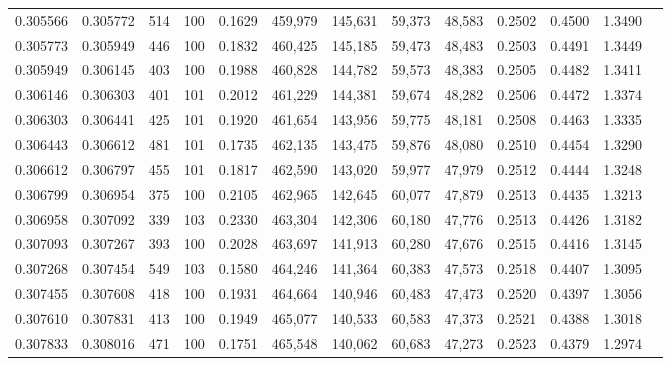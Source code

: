 \begin{tabular}{rrrrrrrrrrrrr}
0.305566 & 0.305772 &   514 & 100 &                                     0.1629 & 459,979 & 145,631 &  59,373 &  48,583 & 0.2502 & 0.4500 & 1.3490 \\
0.305773 & 0.305949 &   446 & 100 &                                     0.1832 & 460,425 & 145,185 &  59,473 &  48,483 & 0.2503 & 0.4491 & 1.3449 \\
0.305949 & 0.306145 &   403 & 100 &                                     0.1988 & 460,828 & 144,782 &  59,573 &  48,383 & 0.2505 & 0.4482 & 1.3411 \\
0.306146 & 0.306303 &   401 & 101 &                                     0.2012 & 461,229 & 144,381 &  59,674 &  48,282 & 0.2506 & 0.4472 & 1.3374 \\
0.306303 & 0.306441 &   425 & 101 &                                     0.1920 & 461,654 & 143,956 &  59,775 &  48,181 & 0.2508 & 0.4463 & 1.3335 \\
0.306443 & 0.306612 &   481 & 101 &                                     0.1735 & 462,135 & 143,475 &  59,876 &  48,080 & 0.2510 & 0.4454 & 1.3290 \\
0.306612 & 0.306797 &   455 & 101 &                                     0.1817 & 462,590 & 143,020 &  59,977 &  47,979 & 0.2512 & 0.4444 & 1.3248 \\
0.306799 & 0.306954 &   375 & 100 &                                     0.2105 & 462,965 & 142,645 &  60,077 &  47,879 & 0.2513 & 0.4435 & 1.3213 \\
0.306958 & 0.307092 &   339 & 103 &                                     0.2330 & 463,304 & 142,306 &  60,180 &  47,776 & 0.2513 & 0.4426 & 1.3182 \\
0.307093 & 0.307267 &   393 & 100 &                                     0.2028 & 463,697 & 141,913 &  60,280 &  47,676 & 0.2515 & 0.4416 & 1.3145 \\
0.307268 & 0.307454 &   549 & 103 &                                     0.1580 & 464,246 & 141,364 &  60,383 &  47,573 & 0.2518 & 0.4407 & 1.3095 \\
0.307455 & 0.307608 &   418 & 100 &                                     0.1931 & 464,664 & 140,946 &  60,483 &  47,473 & 0.2520 & 0.4397 & 1.3056 \\
0.307610 & 0.307831 &   413 & 100 &                                     0.1949 & 465,077 & 140,533 &  60,583 &  47,373 & 0.2521 & 0.4388 & 1.3018 \\
0.307833 & 0.308016 &   471 & 100 &                                     0.1751 & 465,548 & 140,062 &  60,683 &  47,273 & 0.2523 & 0.4379 & 1.2974 \\

\end{tabular}
